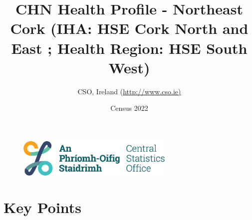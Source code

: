 \documentclass{article}
\title{CHN Health Profile - Northeast Cork (IHA: HSE Cork North and East ;  Health Region: HSE South West) }
\date{Census 2022}
\author{CSO, Ireland  (\url{http://www.cso.ie)}}
\begin{document}


\begin{figure}
	\centering
\includegraphics[width =75mm]{../figures/CSO_Logo.png}
\end{figure}

				 
		   
						  
														  
																																													
												 
			 
\maketitle
					
													   
				 
						 
																																																																											   
				 
				  
  \pagebreak
    	    \tableofcontents

\pagebreak


\section{Key Points}
\end{document}
